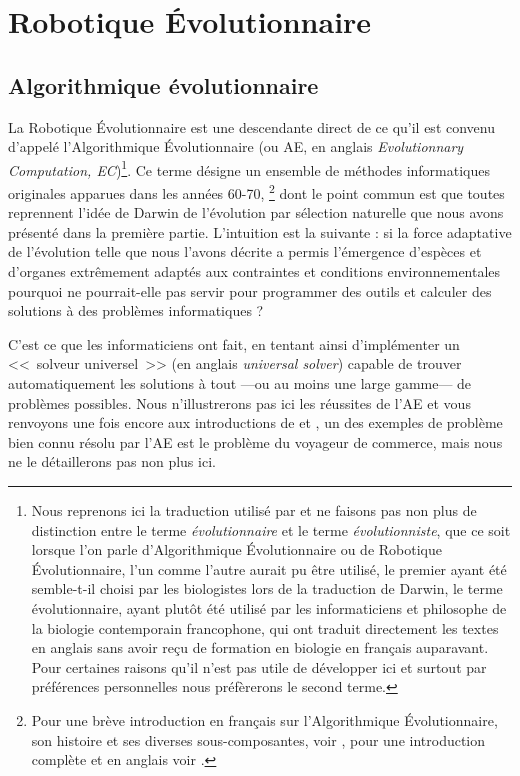 \documentclass[a4paper,10pt]{article}
\begin{document}
\section{Robotique \'Evolutionnaire}
\subsection{Algorithmique évolutionnaire}\label{sec:ae}
La Robotique \'Evolutionnaire est une descendante direct de ce qu'il est convenu d'appelé l'Algorithmique \'Evolutionnaire (ou AE, en anglais \emph{Evolutionnary Computation, EC})\footnote{Nous reprenons ici la traduction utilisé par \cite{schoenauer09lesalgorithmesevolutionnaires} et ne faisons pas non plus de distinction entre le terme \emph{évolutionnaire} et le terme \emph{évolutionniste}, que ce soit lorsque l'on parle d'Algorithmique Évolutionnaire ou de Robotique Évolutionnaire, l'un comme l'autre aurait pu être utilisé, le premier ayant été semble-t-il choisi par les biologistes lors de la traduction de Darwin, le terme évolutionnaire, ayant plutôt été utilisé par les informaticiens et philosophe de la biologie contemporain francophone, qui ont traduit directement les textes en anglais sans avoir reçu de formation en biologie en français auparavant. Pour certaines raisons qu'il n'est pas utile de développer ici et surtout par préférences personnelles nous préfèrerons le second terme.}.
Ce terme désigne un ensemble de méthodes informatiques originales apparues dans les années 60-70, \footnote{Pour une brève introduction en français sur l'Algorithmique Évolutionnaire, son histoire et ses diverses sous-composantes, voir \citet{schoenauer09lesalgorithmesevolutionnaires}, pour une introduction complète et en anglais voir \citet{eiben03introductiontoevolutionarycomputing}.} dont le point commun est que toutes reprennent l'idée de Darwin \citet{darwin1859originspeciesbymeansnaturalselectionorpreservationfavouredracesstrugglelife} de l'évolution par sélection naturelle que nous avons présenté dans la première partie. L'intuition est la suivante : si la force adaptative de l'évolution telle que nous l'avons décrite a permis l'émergence d'espèces et d'organes extrêmement adaptés aux contraintes et conditions environnementales pourquoi ne pourrait-elle pas servir pour programmer des outils et calculer des solutions à des problèmes informatiques ? 

C'est ce que les informaticiens ont fait, en tentant ainsi d'implémenter un <<~solveur universel~>> (en anglais \emph{universal solver}) capable de trouver automatiquement les solutions à tout ---ou au moins une large gamme--- de problèmes possibles. 
Nous n'illustrerons pas ici les réussites de l'AE et vous renvoyons une fois encore aux introductions de \cite{schoenauer09lesalgorithmesevolutionnaires} et \cite{eiben03introductiontoevolutionarycomputing}, un des exemples de problème bien connu résolu par l'AE est le problème du voyageur de commerce, mais nous ne le détaillerons pas non plus ici.
\end{document}
